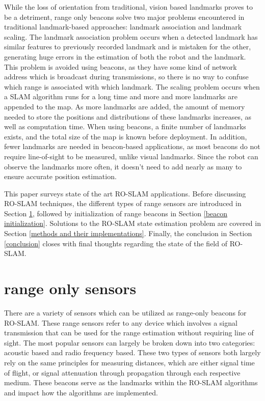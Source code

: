 \documentclass[conference]{IEEEtran}
\begin{document}
		While the loss of orientation from traditional, vision based landmarks  proves to be a detriment, range only beacons solve two major problems encountered in traditional landmark-based approaches: landmark association and landmark scaling. The landmark association problem occurs when a detected landmark has similar features to previously recorded landmark and is mistaken for the other, generating huge errors in the estimation of both the robot and the landmark. This problem is avoided using beacons, as they have some kind of network address which is broadcast during transmissions, so there is no way to confuse which range is associated with which landmark. The scaling problem occurs when a SLAM algorithm runs for a long time and more and more landmarks are appended to the map. As more landmarks are added, the amount of memory needed to store the positions and distributions of these landmarks increases, as well as computation time. When using beacons, a finite number of landmarks exists, and the total size of the map is known before deployment. In addition, fewer landmarks are needed in beacon-based applications, as most beacons do not require line-of-sight to be measured, unlike visual landmarks. Since the robot can observe the landmarks more often, it doesn't need to add nearly as many to ensure accurate position estimation. %
		
		This paper surveys state of the art RO-SLAM applications. Before discussing RO-SLAM techniques, the different types of range sensors are introduced in Section \ref{range only sensors}, followed by initialization of range beacons in Section \ref{beacon initialization}. Solutions to the RO-SLAM state estimation problem are covered in Section \ref{methods and their implementations}. Finally, the conclusion in Section \ref{conclusion} closes with final thoughts regarding the state of the field of RO-SLAM.
	
	
	\section{range only sensors}
	\label{range only sensors}
		There are a variety of sensors which can be utilized as range-only beacons for RO-SLAM. These range sensors refer to any device which involves a signal transmission that can be used for the range estimation without requiring line of sight. The most popular sensors can largely be broken down into two categories: acoustic based and radio frequency based. These two types of sensors both largely rely on the same principles for measuring distances, which are either signal time of flight, or signal attenuation through propagation through each respective medium. These beacons serve as the landmarks within the RO-SLAM algorithms and impact how the algorithms are implemented.
	
\end{document}
